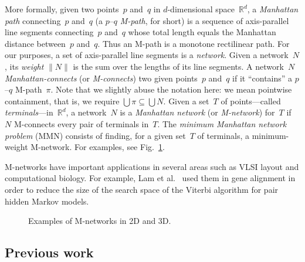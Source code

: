 \documentclass[11pt]{llncs}
\newcommand{\R}{\ensuremath{\mathbb{R}}}
\newcommand{\etal}{et al.}
\begin{document}
More formally, given two points~$p$ and~$q$ in $d$-dimensional
space~$\R^d$, a \emph{Manhattan path} connecting~$p$ and~$q$ (a
$p$--$q$ \emph{M-path}, for short) is a sequence of axis-parallel
line segments connecting~$p$ and~$q$ whose total length equals the
Manhattan distance between~$p$ and~$q$.  
Thus an M-path is a monotone rectilinear path.
For our purposes, a set of axis-parallel line segments is a
\emph{network}.  Given a network~$N$, its \emph{weight} $\|N\|$ is the
sum over the lengths of its line segments.
A network~$N$ \emph{Manhattan-connects} (or \emph{M-connects}) two
given points~$p$ and~$q$ if it ``contains'' a $p$--$q$ M-path~$\pi$. 
Note that we slightly abuse the notation here: we 
mean pointwise containment, that is, we require 
$\bigcup \pi \subseteq \bigcup N$.
Given a set~$T$ of points---called \emph{terminals}---in~$\R^d$, a
network~$N$ is a \emph{Manhattan network} (or \emph{M-network})
for~$T$ if~$N$ M-connects every pair of terminals in~$T$.  
The \emph{minimum Manhattan network problem} (MMN) consists of
finding, for a given set~$T$ of terminals, a minimum-weight M-network.
For examples, see Fig.~\ref{fig:examples}.


M-networks have important applications in several areas such as VLSI
layout and computational biology. For example, Lam
\etal~\cite{lap-pafst-03} used them in gene alignment in order to 
reduce 
the size of the search space of the Viterbi algorithm for pair hidden
Markov models.

\begin{figure}[tb]
  \hfill
  \hfill
  \hfill
  \caption{Examples of M-networks in 2D and 3D.}
  \label{fig:examples}
\end{figure}

\subsection{Previous work} 
\end{document}
